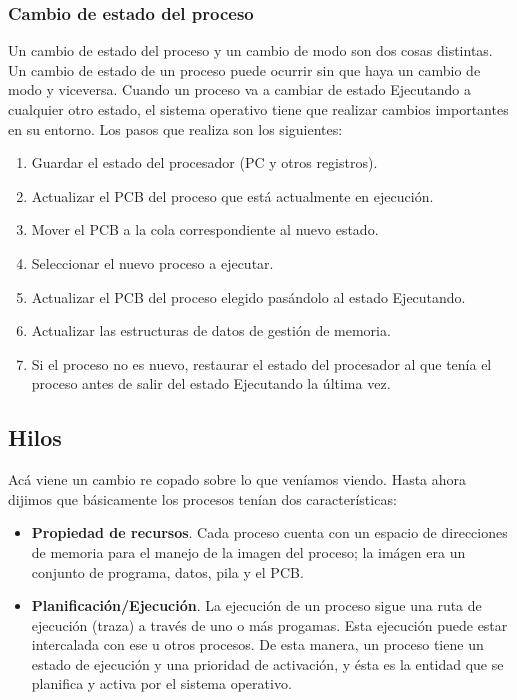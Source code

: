 \documentclass[12pt]{article}
\begin{document}
  \subsubsection{Cambio de estado del proceso}
  Un cambio de estado del proceso y un cambio de modo son dos cosas distintas. Un cambio de estado de un proceso puede ocurrir sin que haya un cambio de modo y viceversa. Cuando un proceso va a cambiar de estado Ejecutando a cualquier otro estado, el sistema operativo tiene que realizar cambios importantes en su entorno. Los pasos que realiza son los siguientes:
  \begin{enumerate}[1.]
    \item Guardar el estado del procesador (PC y otros registros).

    \item Actualizar el PCB del proceso que está actualmente en ejecución.

    \item Mover el PCB a la cola correspondiente al nuevo estado.

    \item Seleccionar el nuevo proceso a ejecutar.

    \item Actualizar el PCB del proceso elegido pasándolo al estado Ejecutando.

    \item Actualizar las estructuras de datos de gestión de memoria.

    \item Si el proceso no es nuevo, restaurar el estado del procesador al que tenía el proceso antes de salir del estado Ejecutando la última vez.
  \end{enumerate}

  \subsection{Hilos}
  Acá viene un cambio re copado sobre lo que veníamos viendo. Hasta ahora dijimos que básicamente los procesos tenían dos características:
  \begin{itemize}
    \item \textbf{Propiedad de recursos}. Cada proceso cuenta con un espacio de direcciones de memoria para el manejo de la imagen del proceso; la imágen era un conjunto de programa, datos, pila y el PCB.

    \item \textbf{Planificación/Ejecución}. La ejecución de un proceso sigue una ruta de ejecución (traza) a través de uno  o más progamas. Esta ejecución puede estar intercalada con ese u otros procesos. De esta manera, un proceso tiene un estado de ejecución y una prioridad de activación, y ésta es la entidad que se planifica y activa por el sistema operativo.
  \end{itemize}
\end{document}
